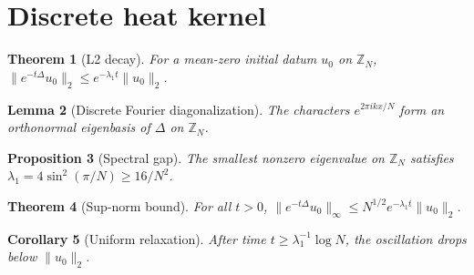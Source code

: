 \documentclass{article}
\newtheorem{theorem}{Theorem}[section]
\newtheorem{lemma}[theorem]{Lemma}
\newtheorem{proposition}[theorem]{Proposition}
\newtheorem{corollary}[theorem]{Corollary}
\begin{document}
\section{Discrete heat kernel}\label{sec:heat}
\begin{theorem}[L2 decay]\label{thm:decay}
For a mean-zero initial datum $u_0$ on $\mathbb{Z}_N$, $\|e^{-t\Delta} u_0\|_2 \le e^{-\lambda_1 t}\|u_0\|_2$.
\end{theorem}
\begin{lemma}[Discrete Fourier diagonalization]\label{lem:fourier}
The characters $e^{2\pi i k x / N}$ form an orthonormal eigenbasis of $\Delta$ on $\mathbb{Z}_N$.
\end{lemma}
\begin{proposition}[Spectral gap]\label{prop:gap}
The smallest nonzero eigenvalue on $\mathbb{Z}_N$ satisfies $\lambda_1 = 4\sin^2(\pi/N) \ge 16/N^2$.
\end{proposition}
\begin{theorem}[Sup-norm bound]\label{thm:sup}
For all $t>0$, $\|e^{-t\Delta} u_0\|_\infty \le N^{1/2} e^{-\lambda_1 t}\|u_0\|_2$.
\end{theorem}
\begin{corollary}[Uniform relaxation]\label{cor:uniform}
After time $t \ge \lambda_1^{-1}\log N$, the oscillation drops below $\|u_0\|_2$.
\end{corollary}
\end{document}

